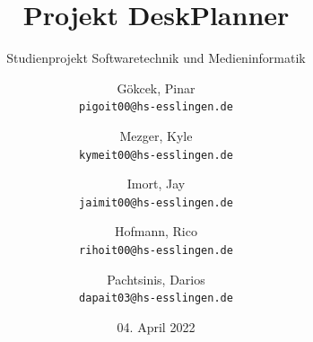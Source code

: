 \documentclass[
    12pt,
    headings=big,
    version=first,
    ngerman,
    a4paper,
    BCOR=5mm,
    DIV=14,
    1headlines,
    pagesize,
    oneside,
    openright,
    titlepage,
    headsepline,
    chapterprefix=false,
    bibliography=totoc,
    toc=graduated,
    listof=graduated,
    numbers=noenddot,
    cleardoublepage=empty,
    fleqn,
    parskip=half,
]{scrbook}
\title{Projekt DeskPlanner}
\subtitle{Studienprojekt Softwaretechnik und Medieninformatik}
\author{
Gökcek, Pinar\\
\texttt{pigoit00@hs-esslingen.de}
\and
Mezger, Kyle\\
\texttt{kymeit00@hs-esslingen.de}
\and
Imort, Jay\\
\texttt{jaimit00@hs-esslingen.de}
\and
Hofmann, Rico\\
\texttt{rihoit00@hs-esslingen.de}
\and
Pachtsinis, Darios\\
\texttt{dapait03@hs-esslingen.de}
}
\date{04. April 2022}
\begin{document}
\begin{titlepage}
    \centering
    \maketitle

    \thispagestyle{empty}

    \vfill

\end{titlepage}

\tableofcontents

\pagebreak

\setcounter{chapter}{-1}

% 














% 


\end{document}
